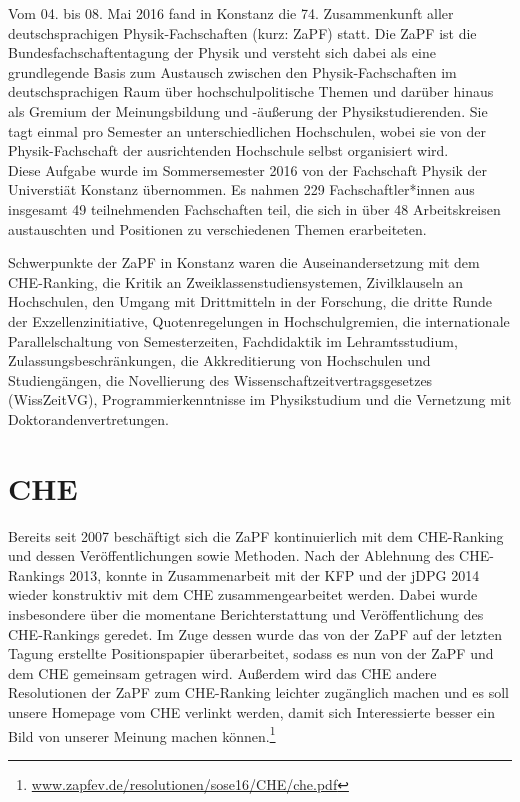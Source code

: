 Vom 04. bis 08. Mai 2016 fand in Konstanz die 74. Zusammenkunft
aller deutschsprachigen Physik-Fachschaften (kurz: ZaPF) statt.  Die ZaPF ist
die Bundesfachschaftentagung der Physik und versteht sich dabei als eine
grundlegende Basis zum Austausch zwischen den Physik-Fachschaften im
deutschsprachigen Raum über hochschulpolitische Themen und darüber hinaus als
Gremium der Meinungsbildung und -äußerung der Physikstudierenden. Sie tagt
einmal pro Semester an unterschiedlichen Hochschulen, wobei sie von der
Physik-Fachschaft der ausrichtenden Hochschule selbst organisiert wird. \\

Diese Aufgabe wurde im Sommersemester 2016 von der Fachschaft Physik der Universtiät Konstanz übernommen. 
Es nahmen 229 Fachschaftler*innen aus insgesamt 49 teilnehmenden Fachschaften teil, 
die sich in über  48 Arbeitskreisen austauschten und Positionen zu verschiedenen Themen erarbeiteten.

Schwerpunkte der ZaPF in Konstanz waren die Auseinandersetzung mit dem CHE-Ranking, 
die Kritik an Zweiklassenstudiensystemen, Zivilklauseln an Hochschulen, den Umgang mit 
Drittmitteln in der Forschung, die dritte Runde der Exzellenzinitiative, Quotenregelungen in Hochschulgremien, 
die internationale Parallelschaltung von Semesterzeiten, Fachdidaktik im Lehramtsstudium, 
Zulassungsbeschränkungen, die Akkreditierung von Hochschulen und Studiengängen, die Novellierung des Wissenschaftzeitvertragsgesetzes
(WissZeitVG), Programmierkenntnisse im Physikstudium und die Vernetzung mit Doktorandenvertretungen.

\newpage

\section*{CHE}  
Bereits seit 2007 beschäftigt sich die ZaPF kontinuierlich mit dem CHE-Ranking und dessen
Veröffentlichungen sowie Methoden. Nach der Ablehnung des CHE-Rankings 2013, konnte
in Zusammenarbeit mit der KFP und der jDPG 2014 wieder konstruktiv mit dem CHE
zusammengearbeitet werden. Dabei wurde insbesondere über die momentane Berichterstattung und 
Veröffentlichung des CHE-Rankings geredet. Im Zuge dessen wurde das von der ZaPF 
auf der letzten Tagung erstellte Positionspapier überarbeitet, sodass es nun von der 
ZaPF und dem CHE gemeinsam getragen wird. Außerdem wird das CHE andere Resolutionen 
der ZaPF zum CHE-Ranking leichter zugänglich machen und es soll unsere Homepage vom CHE 
verlinkt werden, damit sich Interessierte besser ein Bild von unserer Meinung machen können.\footnote{\href{http://www.zapfev.de/resolutionen/sose16/CHE/che.pdf}{\url{www.zapfev.de/resolutionen/sose16/CHE/che.pdf}}}



